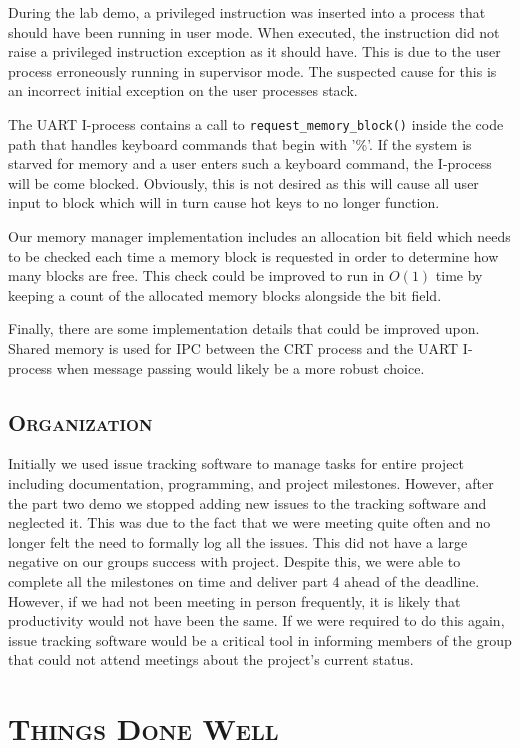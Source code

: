 \documentclass[oneside]{report}
\begin{document}
During the lab demo, a privileged instruction was inserted into a process that
should have been running in user mode. When executed, the instruction did not
raise a privileged instruction exception as it should have. This is due to the
user process erroneously running in supervisor mode. The suspected cause for
this is an incorrect initial exception on the user processes stack.

The UART I-process contains a call to \texttt{request\_memory\_block()} inside
the code path that handles keyboard commands that begin with '\%'. If the
system is starved for memory and a user enters such a keyboard command, the
I-process will be come blocked. Obviously, this is not desired as this will
cause all user input to block which will in turn cause hot keys to no longer
function.

Our memory manager implementation includes an allocation bit field which needs
to be checked each time a memory block is requested in order to determine how
many blocks are free. This check could be improved to run in $O(1)$ time by
keeping a count of the allocated memory blocks alongside the bit field.

Finally, there are some implementation details that could be improved upon.
Shared memory is used for IPC between the CRT process and the UART I-process
when message passing would likely be a more robust choice. 

\subsection{\textsc{Organization}}

Initially we used issue tracking software to manage tasks for entire project
including documentation, programming, and project milestones. However, after
the part two demo we stopped adding new issues to the tracking software and
neglected it. This was due to the fact that we were meeting quite often and no
longer felt the need to formally log all the issues. This did not have a large
negative on our groups success with project. Despite this, we were able to
complete all the milestones on time and deliver part 4 ahead of the deadline.
However, if we had not been meeting in person frequently, it is likely that
productivity would not have been the same. If we were required to do this
again, issue tracking software would be a critical tool in informing members of
the group that could not attend meetings about the project's current status.

\section{\textsc{Things Done Well}}
\end{document}
